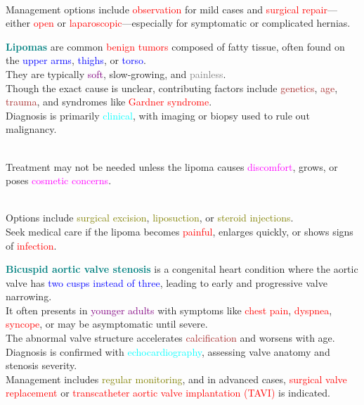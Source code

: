 \documentclass{article}
\begin{document}
\\
Management options include \textcolor{red}{observation} for mild cases and \textcolor{red}{surgical repair}—either \textcolor{red}{open} or \textcolor{red}{laparoscopic}—especially for symptomatic or complicated hernias.

\bigskip

\textcolor{teal}{\Large \bf Lipomas} are common \textcolor{red}{benign tumors} composed of fatty tissue, often found on the \textcolor{blue}{upper arms}, \textcolor{blue}{thighs}, or \textcolor{blue}{torso}.\\
They are typically \textcolor{purple}{soft}, \textcolor{dark red}{slow-growing}, and \textcolor{gray}{painless}.\\
Though the exact cause is unclear, contributing factors include \textcolor{brown}{genetics}, \textcolor{brown}{age}, \textcolor{brown}{trauma}, and syndromes like \textcolor{red}{Gardner syndrome}.\\
Diagnosis is primarily \textcolor{cyan}{clinical}, with imaging or biopsy used to rule out malignancy.

\\
Treatment may not be needed unless the lipoma causes \textcolor{magenta}{discomfort}, grows, or poses \textcolor{magenta}{cosmetic concerns}.

\\
Options include \textcolor{olive}{surgical excision}, \textcolor{olive}{liposuction}, or \textcolor{olive}{steroid injections}.\\
Seek medical care if the lipoma becomes \textcolor{red}{painful}, enlarges quickly, or shows signs of \textcolor{red}{infection}.

\newpage 



\textcolor{teal}{\Large \bf Bicuspid aortic valve stenosis} is a congenital heart condition where the aortic valve has \textcolor{blue}{two cusps instead of three}, leading to early and progressive \textcolor{dark red}{valve narrowing}.\\
It often presents in \textcolor{purple}{younger adults} with symptoms like \textcolor{red}{chest pain}, \textcolor{red}{dyspnea}, \textcolor{red}{syncope}, or may be asymptomatic until severe.\\
The abnormal valve structure accelerates \textcolor{brown}{calcification} and worsens with age.\\

Diagnosis is confirmed with \textcolor{cyan}{echocardiography}, assessing valve anatomy and stenosis severity.\\
Management includes \textcolor{olive}{regular monitoring}, and in advanced cases, \textcolor{red}{surgical valve replacement} or \textcolor{red}{transcatheter aortic valve implantation (TAVI)} is indicated.
\end{document}
